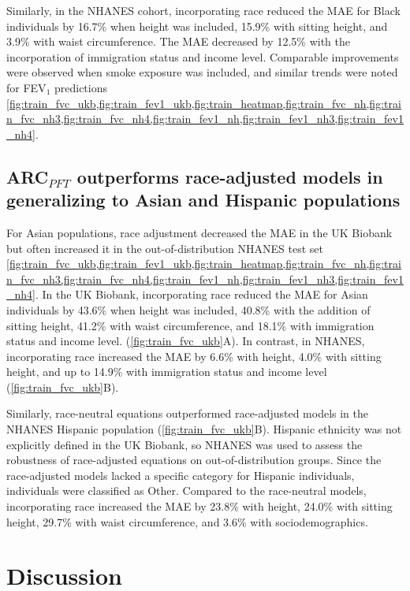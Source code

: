 \documentclass[10pt]{extarticle}
\begin{document}
Similarly, in the NHANES cohort, incorporating race reduced the MAE for Black individuals by 16.7\% when height was included, 15.9\% with sitting height, and 3.9\% with waist circumference. The MAE decreased by 12.5\% with the incorporation of immigration status and income level. Comparable improvements were observed when smoke exposure was included, and similar trends were noted for FEV$_{1}$ predictions \cref{fig:train_fvc_ukb,fig:train_fev1_ukb,fig:train_heatmap,fig:train_fvc_nh,fig:train_fvc_nh3,fig:train_fvc_nh4,fig:train_fev1_nh,fig:train_fev1_nh3,fig:train_fev1_nh4}.

\subsection{ARC$_{PFT}$ outperforms race-adjusted models in generalizing to Asian and Hispanic populations}\label{ARC_NatureHealth_v2:arcpft-outperforms-race-adjusted-models-in-generalizing-to-asian-and-hispanic-populations}

For Asian populations, race adjustment decreased the MAE in the UK Biobank but often increased it in the out-of-distribution NHANES test set \cref{fig:train_fvc_ukb,fig:train_fev1_ukb,fig:train_heatmap,fig:train_fvc_nh,fig:train_fvc_nh3,fig:train_fvc_nh4,fig:train_fev1_nh,fig:train_fev1_nh3,fig:train_fev1_nh4}. In the UK Biobank, incorporating race reduced the MAE for Asian individuals by 43.6\% when height was included, 40.8\% with the addition of sitting height, 41.2\% with waist circumference, and 18.1\% with immigration status and income level. (\cref{fig:train_fvc_ukb}A). In contrast, in NHANES, incorporating race increased the MAE by 6.6\% with height, 4.0\% with sitting height, and up to 14.9\% with immigration status and income level (\cref{fig:train_fvc_ukb}B).

Similarly, race-neutral equations outperformed race-adjusted models in the NHANES Hispanic population (\cref{fig:train_fvc_ukb}B). Hispanic ethnicity was not explicitly defined in the UK Biobank, so NHANES was used to assess the robustness of race-adjusted equations on out-of-distribution groups. Since the race-adjusted models lacked a specific category for Hispanic individuals, individuals were classified as Other. Compared to the race-neutral models, incorporating race increased the MAE by 23.8\% with height, 24.0\% with sitting height, 29.7\% with waist circumference, and 3.6\% with sociodemographics.

\section{Discussion}\label{discussion}
\end{document}
